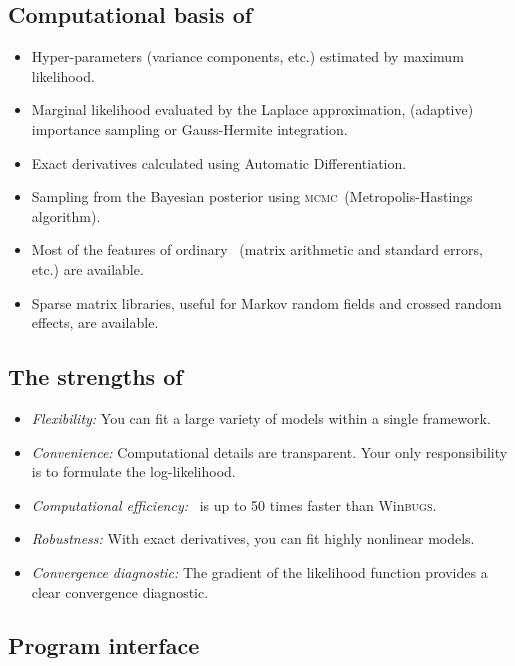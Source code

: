 \documentclass{admbmanual}
\newcommand{\scMCMC}{\textsc{mcmc}}
\newcommand{\scWinBUGS}{Win\textsc{bugs}}
\begin{document}
\subsection{Computational basis of \scAR}

\begin{itemize}
  \item Hyper-parameters (variance components, etc.) estimated by maximum
  likelihood.

  \item Marginal likelihood evaluated by the Laplace approximation, (adaptive)
  importance sampling or Gauss-Hermite integration.

  \item Exact derivatives calculated using Automatic Differentiation.

  \item Sampling from the Bayesian posterior using \scMCMC\ (Metropolis-Hastings
  algorithm).

  \item Most of the features of ordinary \scAB\ (matrix arithmetic and standard
  errors, etc.) are available.

  \item Sparse matrix libraries, useful for Markov random fields and crossed
  random effects, are available.
\end{itemize}

\subsection{The strengths of \scAR}

\begin{itemize}
  \item \textit{Flexibility:} You can fit a large variety of models within a
  single framework.
  \item \textit{Convenience:} Computational details are transparent. Your only
  responsibility is to formulate the log-likelihood.
  \item \textit{Computational efficiency:} \scAR\ is up to 50 times faster than
  \scWinBUGS.
  \item \textit{Robustness:} With exact derivatives, you can fit highly
  nonlinear models.
  \item \textit{Convergence diagnostic:} The gradient of the likelihood function
  provides a clear convergence diagnostic.
\end{itemize}

\subsection{Program interface}
\end{document}

